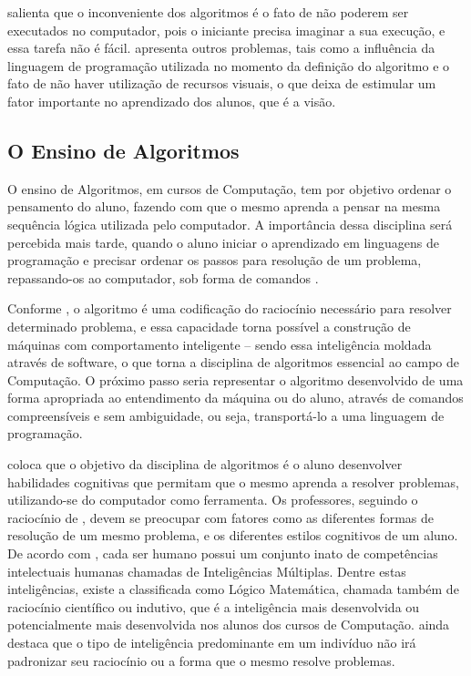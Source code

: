  salienta que o inconveniente dos algoritmos é o fato de não
poderem ser executados no computador, pois o iniciante precisa imaginar a sua
execução, e essa tarefa não é fácil.  apresenta outros
problemas, tais como a influência da linguagem de programação utilizada no
momento da definição do algoritmo e o fato de não haver utilização de recursos
visuais, o que deixa de estimular um fator importante no aprendizado dos alunos,
que é a visão.

\subsection{O Ensino de Algoritmos}

O ensino de Algoritmos, em cursos de Computação, tem por objetivo ordenar o
pensamento do aluno, fazendo com que o mesmo aprenda a pensar na mesma sequência
lógica utilizada pelo computador. A importância dessa disciplina será percebida
mais tarde, quando o aluno iniciar o aprendizado em linguagens de programação e
precisar ordenar os passos para resolução de um problema, repassando-os ao
computador, sob forma de comandos \cite{miranda2004}.

Conforme , o algoritmo é uma codificação do
raciocínio necessário para resolver determinado problema, e essa capacidade
torna possível a construção de máquinas com comportamento inteligente – sendo
essa inteligência moldada através de software, o que torna a disciplina de
algoritmos essencial ao campo de Computação. O próximo passo seria representar
o algoritmo desenvolvido de uma forma apropriada ao entendimento da máquina ou
do aluno, através de comandos compreensíveis e sem ambiguidade, ou seja,
transportá-lo a uma linguagem de programação.

 coloca que o objetivo da disciplina de algoritmos é o aluno
desenvolver habilidades cognitivas que permitam que o mesmo aprenda a resolver
problemas, utilizando-se do computador como ferramenta. Os professores, seguindo
o raciocínio de , devem se preocupar com fatores como as
diferentes formas de resolução de um mesmo problema, e os diferentes estilos
cognitivos de um aluno. De acordo com ,
cada ser humano possui um conjunto inato de competências intelectuais humanas
chamadas de Inteligências Múltiplas. Dentre estas inteligências, existe a
classificada como Lógico Matemática, chamada também de raciocínio científico ou
indutivo, que é a inteligência mais desenvolvida ou potencialmente mais
desenvolvida nos alunos dos cursos de Computação.  ainda destaca
que o tipo de inteligência predominante em um indivíduo não irá padronizar seu
raciocínio ou a forma que o mesmo resolve problemas.

